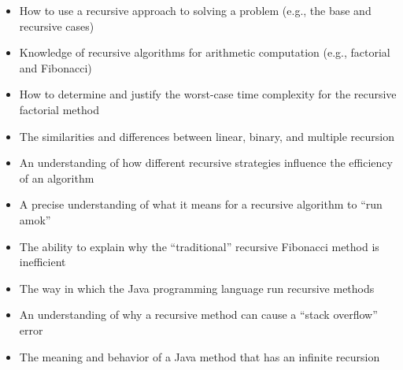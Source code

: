 \documentclass[11pt]{article}
\begin{document}
\begin{itemize}

  \item How to use a recursive approach to solving a problem (e.g., the base
    and recursive cases)

  \item Knowledge of recursive algorithms for arithmetic computation (e.g., factorial
    and Fibonacci)

  \item How to determine and justify the worst-case time complexity for
    the recursive factorial method

  \item The similarities and differences between linear, binary, and multiple
    recursion

  \item An understanding of how different recursive strategies influence the
    efficiency of an algorithm

  \item A precise understanding of what it means for a recursive algorithm to
    ``run amok''

  \item The ability to explain why the ``traditional'' recursive Fibonacci
    method is inefficient

  \item The way in which the Java programming language run recursive methods

  \item An understanding of why a recursive method can cause a ``stack
    overflow'' error

  \item The meaning and behavior of a Java method that has an infinite recursion

\end{itemize}
\end{document}

